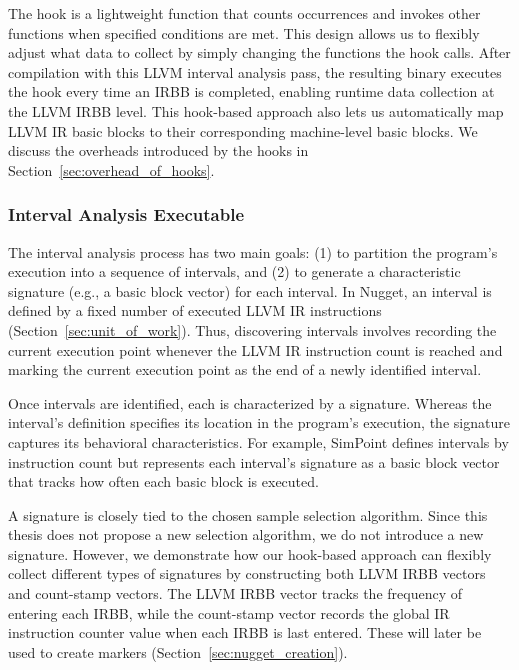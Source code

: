 The hook is a lightweight function that counts occurrences and invokes other functions when specified conditions are met.
This design allows us to flexibly adjust what data to collect by simply changing the functions the hook calls.
After compilation with this LLVM interval analysis pass, the resulting binary executes the hook every time an IRBB is completed, enabling runtime data collection at the LLVM IRBB level.
This hook-based approach also lets us automatically map LLVM IR basic blocks to their corresponding machine-level basic blocks.
We discuss the overheads introduced by the hooks in Section~\ref{sec:overhead_of_hooks}.

\subsubsection{Interval Analysis Executable}\label{sec:interval_analysis_executable}

The interval analysis process has two main goals: (1) to partition the program's execution into a sequence of intervals, and (2) to generate a characteristic signature (e.g., a basic block vector) for each interval.
In Nugget, an interval is defined by a fixed number of executed LLVM IR instructions (Section~\ref{sec:unit_of_work}).
Thus, discovering intervals involves recording the current execution point whenever the LLVM IR instruction count is reached and marking the current execution point as the end of a newly identified interval.

Once intervals are identified, each is characterized by a signature.
Whereas the interval's definition specifies its location in the program's execution, the signature captures its behavioral characteristics.
For example, SimPoint defines intervals by instruction count but represents each interval's signature as a basic block vector that tracks how often each basic block is executed.

A signature is closely tied to the chosen sample selection algorithm.
Since this thesis does not propose a new selection algorithm, we do not introduce a new signature.
However, we demonstrate how our hook-based approach can flexibly collect different types of signatures by constructing both LLVM IRBB vectors and count-stamp vectors.
The LLVM IRBB vector tracks the frequency of entering each IRBB, while the count-stamp vector records the global IR instruction counter value when each IRBB is last entered.
These will later be used to create markers (Section~\ref{sec:nugget_creation}).

